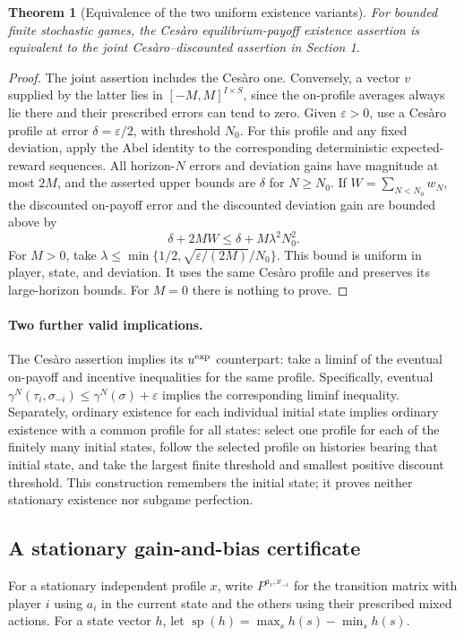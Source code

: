 \documentclass[11pt,a4paper]{article}
\newtheorem{theorem}{Theorem}[section]
\theoremstyle{definition}
\theoremstyle{remark}
\begin{document}
\begin{theorem}[Equivalence of the two uniform existence variants]
For bounded finite stochastic games, the Ces\`aro equilibrium-payoff existence assertion is equivalent to the joint Ces\`aro--discounted assertion in Section 1.
\end{theorem}
\begin{proof}
The joint assertion includes the Ces\`aro one. Conversely, a vector $v$ supplied by the latter lies in $[-M,M]^{I\times S}$, since the on-profile averages always lie there and their prescribed errors can tend to zero. Given $\varepsilon>0$, use a Ces\`aro profile at error $\delta=\varepsilon/2$, with threshold $N_0$. For this profile and any fixed deviation, apply the Abel identity to the corresponding deterministic expected-reward sequences. All horizon-$N$ errors and deviation gains have magnitude at most $2M$, and the asserted upper bounds are $\delta$ for $N\geq N_0$. If $W=\sum_{N<N_0}w_N$, the discounted on-payoff error and the discounted deviation gain are bounded above by
\[
 \delta+2MW\leq\delta+M\lambda^2N_0^2.
\]
For $M>0$, take $\lambda\leq\min\{1/2,\sqrt{\varepsilon/(2M)}/N_0\}$. This bound is uniform in player, state, and deviation. It uses the same Ces\`aro profile and preserves its large-horizon bounds. For $M=0$ there is nothing to prove.
\end{proof}

\paragraph{Two further valid implications.}
The Ces\`aro assertion implies its $u^{\rm exp}$ counterpart: take a liminf of the eventual on-payoff and incentive inequalities for the same profile. Specifically, eventual $\gamma^N(\tau_i,\sigma_{-i})\leq\gamma^N(\sigma)+\varepsilon$ implies the corresponding liminf inequality. Separately, ordinary existence for each individual initial state implies ordinary existence with a common profile for all states: select one profile for each of the finitely many initial states, follow the selected profile on histories bearing that initial state, and take the largest finite threshold and smallest positive discount threshold. This construction remembers the initial state; it proves neither stationary existence nor subgame perfection.

\subsection{A stationary gain-and-bias certificate}
For a stationary independent profile $x$, write $P^{a_i,x_{-i}}$ for the transition matrix with player $i$ using $a_i$ in the current state and the others using their prescribed mixed actions. For a state vector $h$, let $\operatorname{sp}(h)=\max_sh(s)-\min_sh(s)$.
\end{document}
